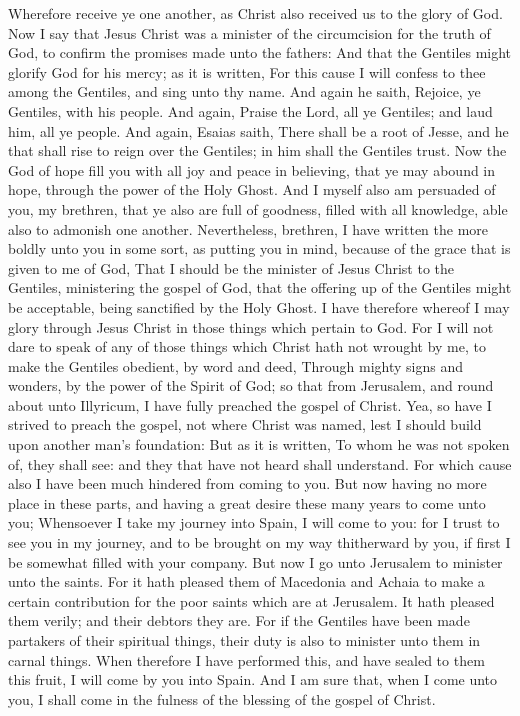  Wherefore receive ye one another, as Christ also received
us to the glory of God.  Now I say that Jesus Christ was a
minister of the circumcision for the truth of God, to confirm the
promises made unto the fathers:  And that the Gentiles
might glorify God for his mercy; as it is written, For this cause I will
confess to thee among the Gentiles, and sing unto thy name.
 And again he saith, Rejoice, ye Gentiles, with his
people.  And again, Praise the Lord, all ye Gentiles; and
laud him, all ye people.  And again, Esaias saith, There
shall be a root of Jesse, and he that shall rise to reign over the
Gentiles; in him shall the Gentiles trust.  Now the God
of hope fill you with all joy and peace in believing, that ye may abound
in hope, through the power of the Holy Ghost.  And I
myself also am persuaded of you, my brethren, that ye also are full of
goodness, filled with all knowledge, able also to admonish one another.
 Nevertheless, brethren, I have written the more boldly
unto you in some sort, as putting you in mind, because of the grace that
is given to me of God,  That I should be the minister of
Jesus Christ to the Gentiles, ministering the gospel of God, that the
offering up of the Gentiles might be acceptable, being sanctified by the
Holy Ghost.  I have therefore whereof I may glory through
Jesus Christ in those things which pertain to God.  For I
will not dare to speak of any of those things which Christ hath not
wrought by me, to make the Gentiles obedient, by word and deed,
 Through mighty signs and wonders, by the power of the
Spirit of God; so that from Jerusalem, and round about unto Illyricum, I
have fully preached the gospel of Christ.  Yea, so have I
strived to preach the gospel, not where Christ was named, lest I should
build upon another man's foundation:  But as it is
written, To whom he was not spoken of, they shall see: and they that
have not heard shall understand.  For which cause also I
have been much hindered from coming to you.  But now
having no more place in these parts, and having a great desire these
many years to come unto you;  Whensoever I take my
journey into Spain, I will come to you: for I trust to see you in my
journey, and to be brought on my way thitherward by you, if first I be
somewhat filled with your company.  But now I go unto
Jerusalem to minister unto the saints.  For it hath
pleased them of Macedonia and Achaia to make a certain contribution for
the poor saints which are at Jerusalem.  It hath pleased
them verily; and their debtors they are. For if the Gentiles have been
made partakers of their spiritual things, their duty is also to minister
unto them in carnal things.  When therefore I have
performed this, and have sealed to them this fruit, I will come by you
into Spain.  And I am sure that, when I come unto you, I
shall come in the fulness of the blessing of the gospel of Christ.

